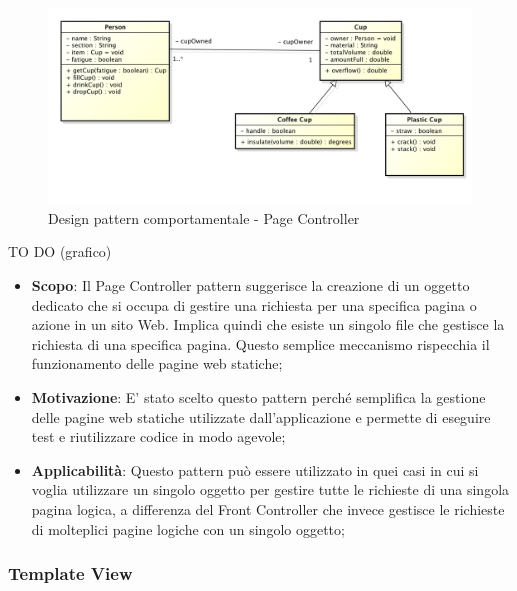 		
		\begin{figure}[htbp]
			\centering
			\centerline{\includegraphics[scale=0.3]{./images/example_graph.png}}
			\caption{Design pattern comportamentale - Page Controller}
		\end{figure}
		TO DO (grafico)
		
		
		\begin{itemize}
			\item \textbf{Scopo}: Il Page Controller pattern suggerisce la creazione di un oggetto dedicato che si occupa di gestire una richiesta per una specifica pagina o azione in un sito Web. Implica quindi che esiste un singolo file che gestisce la richiesta di una specifica pagina. Questo semplice meccanismo rispecchia il funzionamento delle pagine web statiche;
					
			\item \textbf{Motivazione}: E' stato scelto questo pattern perché semplifica la gestione delle pagine web statiche utilizzate dall'applicazione e permette di eseguire test e riutilizzare codice in modo agevole;
			
			\item \textbf{Applicabilità}: Questo pattern può essere utilizzato in quei casi in cui si voglia utilizzare un singolo oggetto per gestire tutte le richieste di una singola pagina logica, a differenza del Front Controller che invece gestisce le richieste di molteplici pagine logiche con un singolo oggetto;
			
		\end{itemize}
		
		
		\newpage
		\subsubsection{Template View} %
		
